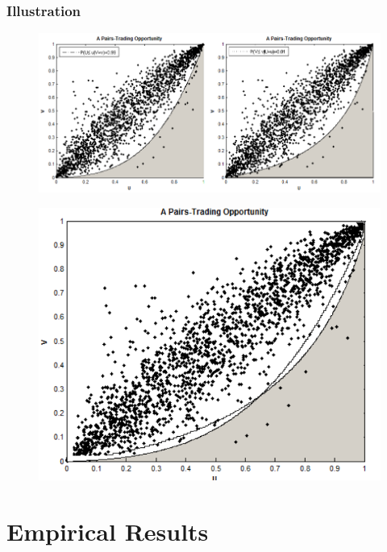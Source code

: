 \documentclass[pdf,9pt,xcolor=dvipsnames,hide notes]{beamer}
\begin{document}
	\begin{frame}
\frametitle{Illustration}

\begin{figure}[htbp]
	\centering
	\includegraphics[scale=0.34]{trading_opt.png}
	\label{fig:trad_opt}
\end{figure}

\begin{figure}[htbp]
	\centering
	\includegraphics[scale=0.34]{trading_opt2.png}
	\label{fig:trad_opt2}
\end{figure}

\end{frame}



\section{Empirical Results}
\end{document}
